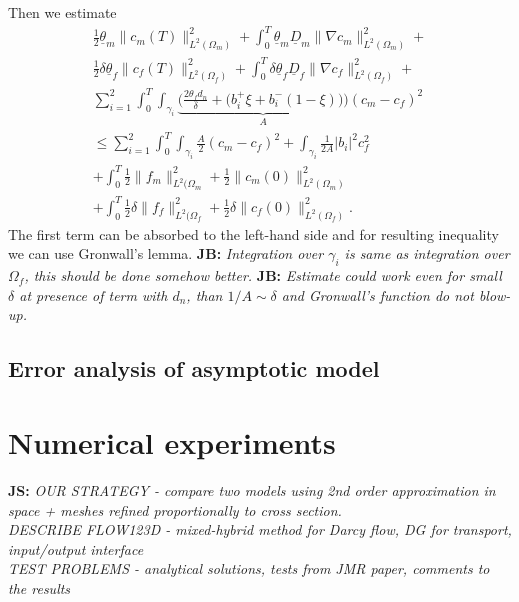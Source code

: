 \documentclass[a4paper]{article}
\def\abs#1{\lvert#1\rvert}
\def\grad{\nabla}
\def\norm#1{\|#1\|}
\newcommand{\note}[2]{{\color{blue} \textbf{ #1:} \textit{#2}}}
\begin{document}
Then we estimate
\def\ul{\underline}
\begin{align*}
  \frac12 \ul{\theta}_m\norm{c_m(T)}_{L^2(\Omega_m)}^2 + \int_0^T \ul{\theta}_m \ul{D}_m \norm{\grad c_m}_{L^2(\Omega_m)}^2 + \\
  \frac12 \delta\ul{\theta}_f\norm{c_f(T)}_{L^2(\Omega_f)}^2 + \int_0^T \delta \ul{\theta}_f \ul{D}_f \norm{\grad c_f}_{L^2(\Omega_f)}^2+\\
   \sum_{i=1}^{2} \int_0^T \int_{\gamma_i} \underbrace{\Big(\frac{2\theta_f d_n}{\delta} + \big(b_i^+ \xi + b_i^-(1-\xi)\big)\Big)}_{A} (c_m-c_f)^2\\
   \le \sum_{i=1}^2 \int_0^T \int_{\gamma_i} \frac{A}{2} (c_m-c_f)^2 + \int_{\gamma_i} \frac{1}{2A}\abs{b_i}^2 c_f^2 \\
   + \int_0^T \frac12\norm{f_m}^2_{L^2(\Omega_m} + \frac12\norm{c_m(0)}^2_{L^2(\Omega_m)}\\
   + \int_0^T \frac12\delta\norm{f_f}^2_{L^2(\Omega_f} + \frac12\delta\norm{c_f(0)}^2_{L^2(\Omega_f)}.
\end{align*}
The first term can be absorbed to the left-hand side and for resulting inequality we can use Gronwall's lemma. 
\note{JB}{Integration over $\gamma_i$ is same as integration over $\Omega_f$, this should be done somehow better.}
\note{JB}{
Estimate could work even for small $\delta$ at presence of term with $d_n$, than $1/A \sim \delta$ and Gronwall's function do not blow-up.}



\subsection{Error analysis of asymptotic model}



\section{Numerical experiments}
\label{sc:numerics}

\note{JS}{
OUR STRATEGY - compare two models using 2nd order approximation in space + meshes refined proportionally to cross section.
\\
DESCRIBE FLOW123D - mixed-hybrid method for Darcy flow, DG for transport, input/output interface
\\
TEST PROBLEMS - analytical solutions, tests from JMR paper, comments to the results
}














%





\end{document}
